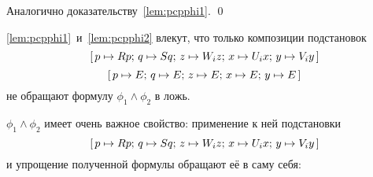 \begin{proof*}
Аналогично доказательству~\autoref{lem:pcpphi1}.
\qed\end{proof*}
\autoref{lem:pcpphi1}~и~\autoref{lem:pcpphi2} влекут, что только композиции подстановок
\[
    \textrm{[} \, p \mapsto {R}p; \, q \mapsto {S}q; \,
    z \mapsto {W}_{i}z; \,
    x \mapsto {U}_{i}x; \,
    y \mapsto {V}_{i}y \, \textrm{]}
\]
\[
    \textrm{[} \, p \mapsto {E}; \, q \mapsto {E}; \,
    z \mapsto {E}; \, x \mapsto {E}; \,
    y \mapsto {E} \, \textrm{]}
\]
не обращают формулу $\phi_{1} \land \phi_{2}$ в ложь.

$\phi_{1} \land \phi_{2}$ имеет очень важное свойство: применение к ней подстановки 
\[
    \textrm{[} \, p \mapsto {R}p; \, q \mapsto {S}q; \,
    z \mapsto {W}_{i}z; \,
    x \mapsto {U}_{i}x; \,
    y \mapsto {V}_{i}y \, \textrm{]}
\]
и упрощение полученной формулы обращают её в саму себя:
